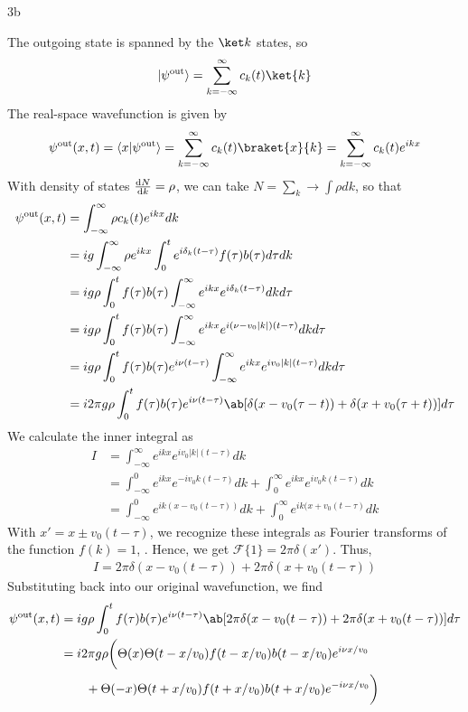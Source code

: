\documentclass[12pt]{article}
\begin{document}
\begin{exc}{3b}
\end{exc}
\begin{ans}
    The outgoing state is spanned by the $\ket k$ states, so 
    \[\uket{\psi^{\textrm{out}}} = \sum_{k = -\infty}^\infty c_k(t)\ket{k}\]
    The real-space wavefunction is given by 
    \begin{align*}
        \psi^{\textrm{out}}(x, t) = \ubraket{x}{\psi^{\textrm{out}}} = \sum_{k = -\infty}^\infty c_k(t) \braket{x}{k} = \sum_{k = -\infty}^\infty c_k(t)e^{ikx}
    \end{align*}
    With density of states $\odv{N}{k} = \rho$, we can take $N = \sum_k \to \int \rho dk$, so that
    \begin{align*}
        \psi^{\textrm{out}}(x, t) 
        &= \int_{-\infty}^\infty \rho c_k(t) e^{ikx}dk\\
        &= ig \int_{-\infty}^\infty  \rho e^{ikx} \int_0^t e^{i\delta_k(t - \tau)}f(\tau)b(\tau)d\tau dk \\ 
        &= ig \rho \int_0^t f(\tau)b(\tau) \int_{-\infty}^\infty e^{ikx}e^{i \delta_k(t - \tau)}dk d\tau \\ 
         &= ig \rho \int_0^t f(\tau)b(\tau) \int_{-\infty}^\infty e^{ikx}e^{i(\nu - v_0|k|)(t - \tau)}dk d\tau \\ 
         &= ig \rho \int_0^t f(\tau)b(\tau) e^{i\nu(t - \tau)}\int_{-\infty}^\infty e^{ikx}e^{iv_0|k|(t - \tau)}dk d\tau   \\ 
         &= i 2\pi g \rho \int_0^t f(\tau)b(\tau) e^{i\nu(t - \tau)}\ab[\delta(x - v_0(\tau - t)) + \delta(x + v_0(\tau + t))]d\tau 
    \end{align*}
    We calculate the inner integral as 
    \begin{align*}
        I &= \int_{-\infty}^\infty e^{ikx}e^{iv_0|k|(t - \tau)}dk\\ 
        &= \int_{-\infty}^0 e^{ikx}e^{-iv_0k(t - \tau)}dk + \int_{0}^\infty e^{ikx}e^{iv_0k(t - \tau)}dk \\
        &= \int_{-\infty}^0 e^{ik(x - v_0(t - \tau))}dk + \int_{0}^\infty e^{ik(x + v_0(t - \tau)}dk
    \end{align*}
    With $x' = x \pm v_0(t - \tau)$, we recognize these integrals as Fourier transforms of the function $f(k) = 1$, . Hence, we get $\mathcal F\{1\} = 2\pi \delta(x')$. Thus, 
    \begin{align*}
        I = 2\pi\delta(x - v_0(t - \tau)) + 2\pi\delta(x + v_0(t - \tau))
    \end{align*}
    Substituting back into our original wavefunction, we find 
    \begin{align*}
         \psi^{\textrm{out}}(x, t) 
         &= ig \rho \int_0^t f(\tau)b(\tau) e^{i\nu(t - \tau)}\ab[2\pi\delta(x - v_0(t - \tau)) + 2\pi\delta(x + v_0(t - \tau))]d\tau  \\
         &= i2\pi g \rho\bigg(\Theta(x)\Theta(t - x/v_0)f(t - x/v_0)b(t - x/v_0)e^{i\nu x/v_0} \\ 
         & \qquad +  \Theta(-x)\Theta(t + x/v_0)f(t + x/v_0)b(t + x/v_0)e^{-i\nu x/v_0}\bigg)
    \end{align*}
\end{ans}
\end{document}

